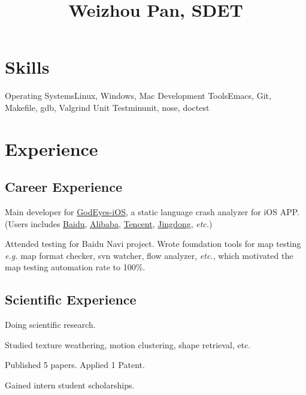 \documentclass[11pt,a4paper,nolmodern]{moderncv}
\title{Weizhou Pan, SDET}
\begin{document}
\setmainfont{Minion Pro}
\setsansfont{Myriad Pro}

\maketitle

\section{Skills}

           {Operating Systems}{Linux, Windows, Mac}
           {Development Tools}{Emacs, Git, Makefile, gdb, Valgrind}
           {Unit Test}{minunit, nose, doctest}

\section{Experience}

\subsection{Career Experience}

{
\begin{tightitemize}%
 \item Main developer for \href{http://godeyes.duapp.com}{GodEyes-iOS}, a static
   language crash analyzer for iOS APP. (Users includes \href{http://www.baidu.com}{Baidu\texttrademark},
   \href{http://www.taobao.com}{Alibaba\texttrademark}, \href{http://www.qq.com}{Tencent\texttrademark}, \href{http://jd.com}{Jingdong\texttrademark}, \textsl{etc.})
 \item Attended testing for Baidu Navi project. Wrote foundation tools for
   map testing \textsl{e.g.} map format checker, svn
   watcher, flow analyzer, \textsl{etc.}, which motivated
   the map testing automation rate to 100\%.
 \end{tightitemize}}

\subsection{Scientific Experience}

{Doing scientific research.
\begin{tightitemize}%
 \item Studied texture weathering, motion clustering, shape retrieval, etc.
 \item Published 5 papers. Applied 1 Patent.
 \item Gained intern student scholarships. 
 \end{tightitemize}}
\end{document}
